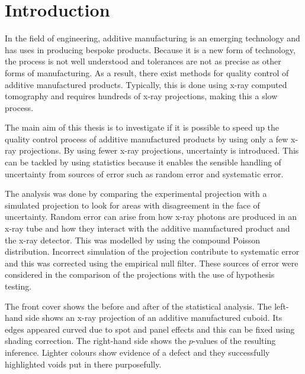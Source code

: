 \documentclass[12pt, a4paper, twoside]{memoir}
\begin{document}
\chapter{Introduction}

In the field of engineering, additive manufacturing is an emerging technology and has uses in producing bespoke products. Because it is a new form of technology, the process is not well understood and tolerances are not as precise as other forms of manufacturing. As a result, there exist methods for quality control of additive manufactured products. Typically, this is done using x-ray computed tomography and requires hundreds of x-ray projections, making this a slow process.

The main aim of this thesis is to investigate if it is possible to speed up the quality control process of additive manufactured products by using only a few x-ray projections. By using fewer x-ray projections, uncertainty is introduced. This can be tackled by using statistics because it enables the sensible handling of uncertainty from sources of error such as random error and systematic error.

The analysis was done by comparing the experimental projection with a simulated projection to look for areas with disagreement in the face of uncertainty. Random error can arise from how x-ray photons are produced in an x-ray tube and how they interact with the additive manufactured product and the x-ray detector. This was modelled by using the compound Poisson distribution. Incorrect simulation of the projection contribute to systematic error and this was corrected using the empirical null filter. These sources of error were considered in the comparison of the projections with the use of hypothesis testing.

The front cover shows the before and after of the statistical analysis. The left-hand side shows an x-ray projection of an additive manufactured cuboid. Its edges appeared curved due to spot and panel effects and this can be fixed using shading correction. The right-hand side shows the $p$-values of the resulting inference. Lighter colours show evidence of a defect and they successfully highlighted voids put in there purposefully.
\end{document}
